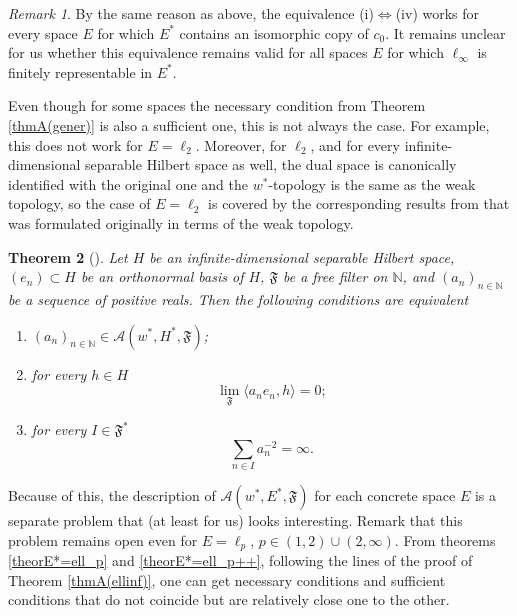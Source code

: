 \documentclass[11pt,twoside, reqno]{amsart}
\newcommand{\N}{{\mathbb N}}
\newcommand{\F}{\mathfrak{F}}
\newcommand{\flim}{\lim\limits_\F }
\theoremstyle{plain}
\newtheorem{theorem}{Theorem}[section]
\theoremstyle{remark}
\newtheorem{remark}[theorem]{Remark}
\theoremstyle{definition}
\numberwithin{equation}{section}
\begin{document}
\begin{remark} \label{remthmA(ellinf)}
By the same reason as above, the equivalence   (i)$\Longleftrightarrow$(iv) works for every space $E$ for which $E^*$ contains an isomorphic copy of $c_0$. It remains unclear for us whether this equivalence remains valid for all spaces $E$ for which $\ell_\infty$ is finitely representable in $E^*$.
\end{remark}

Even though for some spaces the necessary condition from  Theorem \ref{thmA(gener)} is also a sufficient one, this is not always the case. For example, this does not work for $E = \ell_2$. Moreover, 
for $\ell_2$, and for every  infinite-dimensional separable Hilbert space as well, the dual space is canonically identified with the original one and the $w^*$-topology is the same as the weak topology, so the case of $E=\ell_2$ is covered by the corresponding results from \cite{kaleor} that was formulated originally in terms of the weak topology.

\begin{theorem}[{\cite[Theorem 3.4]{kaleor}}] \label{thmA(H)}
Let $H$ be an infinite-dimensional separable Hilbert space, $(e_n) \subset H$ be an orthonormal basis of $H$, $\F$ be a free filter on $\N$, and  $(a_n)_{n \in \N}$ be a sequence of positive reals. Then the following conditions are equivalent

\begin{enumerate}
\item[(i)]  $(a_n)_{n \in \N} \in \mathcal A(w^*, H^*, \F)$;

\item[(ii)] for every $h \in H$
$$
\flim \langle a_n e_n, h \rangle = 0;
$$

\item[(iii)]  for every $I \in \F^*$
$$
\sum\limits_{n \in I} a_n^{-2} = \infty.
$$
\end{enumerate}
\end{theorem}

Because of this, the description of $\mathcal A(w^*, E^*, \F)$ for each concrete space $E$ is a separate problem that (at least for us) looks interesting. Remark that this problem remains open even for $E=\ell_p$, $p \in (1, 2) \cup (2, \infty)$. From theorems \ref{theorE*=ell_p} and \ref{theorE*=ell_p++}, following the lines of the proof of Theorem \ref{thmA(ellinf)}, one can get necessary conditions and sufficient conditions that do not coincide but are relatively close one to the other. 
\end{document}
